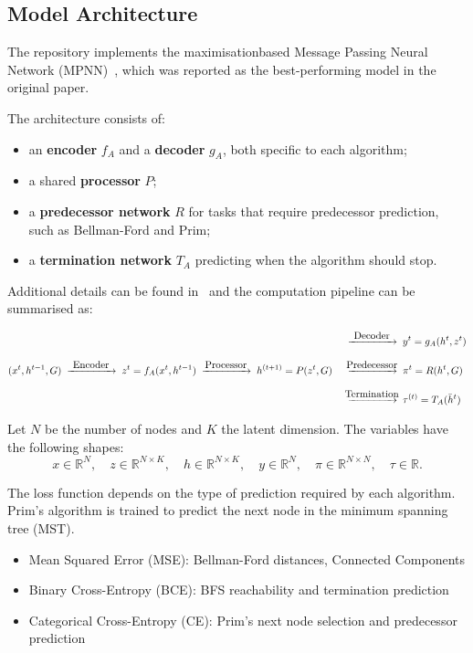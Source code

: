 \documentclass[11pt, a4paper]{article}
\begin{document}
\subsection{Model Architecture}

The repository implements the maximisation\-based Message Passing Neural Network (MPNN)~\cite{gilmer2017neural}, which was reported as the best-performing model in the original paper.

The architecture consists of:
\begin{itemize}
\item an \textbf{encoder} $f_A$ and a \textbf{decoder} $g_A$, both specific to each algorithm;
\item a shared \textbf{processor} $P$;
\item a \textbf{predecessor network} $R$ for tasks that require predecessor prediction, such as Bellman-Ford and Prim;
\item a \textbf{termination network} $T_A$ predicting when the algorithm should stop.
\end{itemize}

Additional details can be found in~\cite{velickovic2022clrs} and the computation pipeline can be summarised as:

\[
\begin{aligned}
&
&&
\;\xrightarrow{\makebox[1.5cm]{\text{Decoder}}}\; y^t = g_A(h^t, z^t)
\\[8pt]
(x^{t}, h^{t-1}, G)
&\;\xrightarrow{\makebox[1.5cm]{\text{Encoder}}}\;
z^{t} = f_A(x^{t}, h^{t-1}) \;\xrightarrow{\makebox[1.5cm]{\text{Processor}}}\;
h^{(t+1)} = P(z^t, G)
&&
\;\xrightarrow{\makebox[1.5cm]{\text{Predecessor}}}\; \pi^t=R(h^t, G)
\\[8pt]
&&&
\;\xrightarrow{\makebox[1.5cm]{\text{Termination}}}\; \tau^{(t)} = T_A(\bar{h}^t)
\end{aligned}
\]

Let $N$ be the number of nodes and $K$ the latent dimension. The variables have the following shapes:
\[
x \in \mathbb{R}^{N}, \quad
z \in \mathbb{R}^{N \times K}, \quad
h \in \mathbb{R}^{N \times K}, \quad
y \in \mathbb{R}^{N}, \quad
\pi \in \mathbb{R}^{N \times N}, \quad
\tau \in \mathbb{R}.
\]

The loss function depends on the type of prediction required by each algorithm. Prim's algorithm is trained to predict the next node in the minimum spanning tree (MST).

\begin{itemize}
\item Mean Squared Error (MSE): Bellman-Ford distances, Connected Components
\item Binary Cross-Entropy (BCE): BFS reachability and termination prediction
\item Categorical Cross-Entropy (CE): Prim's next node selection and predecessor prediction
\end{itemize}
\end{document}
